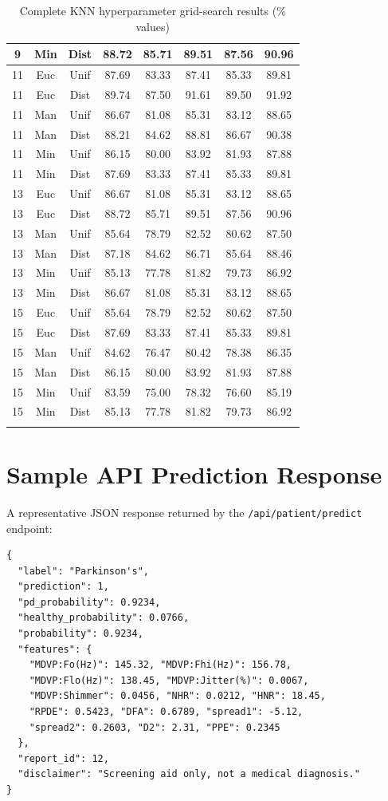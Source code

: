 \documentclass[oneside,a4paper,12pt]{report}
\begin{document}
\begin{appendices}
{\begin{longtable}{|c|c|c|c|c|c|c|c|}
9 & Min & Dist & 88.72 & 85.71 & 89.51 & 87.56 & 90.96 \\ \hline
11 & Euc & Unif & 87.69 & 83.33 & 87.41 & 85.33 & 89.81 \\ \hline
11 & Euc & Dist & 89.74 & 87.50 & 91.61 & 89.50 & 91.92 \\ \hline
11 & Man & Unif & 86.67 & 81.08 & 85.31 & 83.12 & 88.65 \\ \hline
11 & Man & Dist & 88.21 & 84.62 & 88.81 & 86.67 & 90.38 \\ \hline
11 & Min & Unif & 86.15 & 80.00 & 83.92 & 81.93 & 87.88 \\ \hline
11 & Min & Dist & 87.69 & 83.33 & 87.41 & 85.33 & 89.81 \\ \hline
13 & Euc & Unif & 86.67 & 81.08 & 85.31 & 83.12 & 88.65 \\ \hline
13 & Euc & Dist & 88.72 & 85.71 & 89.51 & 87.56 & 90.96 \\ \hline
13 & Man & Unif & 85.64 & 78.79 & 82.52 & 80.62 & 87.50 \\ \hline
13 & Man & Dist & 87.18 & 84.62 & 86.71 & 85.64 & 88.46 \\ \hline
13 & Min & Unif & 85.13 & 77.78 & 81.82 & 79.73 & 86.92 \\ \hline
13 & Min & Dist & 86.67 & 81.08 & 85.31 & 83.12 & 88.65 \\ \hline
15 & Euc & Unif & 85.64 & 78.79 & 82.52 & 80.62 & 87.50 \\ \hline
15 & Euc & Dist & 87.69 & 83.33 & 87.41 & 85.33 & 89.81 \\ \hline
15 & Man & Unif & 84.62 & 76.47 & 80.42 & 78.38 & 86.35 \\ \hline
15 & Man & Dist & 86.15 & 80.00 & 83.92 & 81.93 & 87.88 \\ \hline
15 & Min & Unif & 83.59 & 75.00 & 78.32 & 76.60 & 85.19 \\ \hline
15 & Min & Dist & 85.13 & 77.78 & 81.82 & 79.73 & 86.92 \\ \hline
\caption{Complete KNN hyperparameter grid-search results (\% values)}
\label{tab:grid}
\end{longtable}
}

\chapter{Sample API Prediction Response}
A representative JSON response returned by the \texttt{/api/patient/predict}
endpoint:

\begin{verbatim}
{
  "label": "Parkinson's",
  "prediction": 1,
  "pd_probability": 0.9234,
  "healthy_probability": 0.0766,
  "probability": 0.9234,
  "features": {
    "MDVP:Fo(Hz)": 145.32, "MDVP:Fhi(Hz)": 156.78,
    "MDVP:Flo(Hz)": 138.45, "MDVP:Jitter(%)": 0.0067,
    "MDVP:Shimmer": 0.0456, "NHR": 0.0212, "HNR": 18.45,
    "RPDE": 0.5423, "DFA": 0.6789, "spread1": -5.12,
    "spread2": 0.2603, "D2": 2.31, "PPE": 0.2345
  },
  "report_id": 12,
  "disclaimer": "Screening aid only, not a medical diagnosis."
}
\end{verbatim}

\end{appendices}
\end{document}
